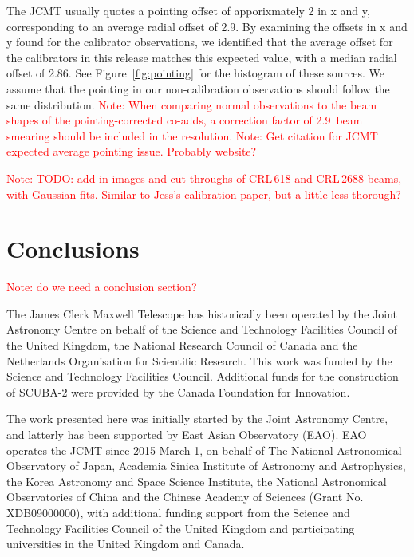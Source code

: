 \documentclass[twocolumn,times]{aastex6}
\newcommand{\note}[1]{\textcolor{red}{Note: #1}}
\begin{document}
The JCMT usually quotes a pointing offset of apporixmately 2\arcsec{}
in x and y, corresponding to an average radial offset of
2.9\arcsec{}. By examining the offsets in x and y found for the
calibrator observations, we identified that the average offset for the
calibrators in this release matches this expected value, with a median
radial offset of 2.86\arcsec{}. See Figure~\ref{fig:pointing} for the
histogram of these sources. We assume that the pointing in our
non-calibration observations should follow the same distribution. \note{When
comparing normal observations to the beam shapes of the
pointing-corrected co-adds, a correction factor of 2.9\arcsec\ beam
smearing should be included in the resolution.}
\note{Get citation for JCMT expected average pointing issue. Probably
  website?}

\note{TODO: add in images and cut throughs of CRL\,618 and CRL\,2688
  beams, with Gaussian fits. Similar to Jess's calibration paper, but
  a little less thorough?}






\section{Conclusions}
\note{do we need a conclusion section?}

\acknowledgments
The James Clerk Maxwell Telescope has historically been operated by
the Joint Astronomy Centre on behalf of the Science and Technology
Facilities Council of the United Kingdom, the National Research
Council of Canada and the Netherlands Organisation for Scientific
Research. This work was funded by the Science and Technology
Facilities Council.  Additional funds for the construction of SCUBA-2
were provided by the Canada Foundation for Innovation.

The work presented here was initially started by the Joint Astronomy
Centre, and latterly has been supported by East Asian Observatory (EAO).
EAO operates the JCMT since 2015 March 1, on behalf of The
National Astronomical Observatory of Japan, Academia Sinica Institute
of Astronomy and Astrophysics, the Korea Astronomy and Space Science
Institute, the National Astronomical Observatories of China and the
Chinese Academy of Sciences (Grant No. XDB09000000), with additional
funding support from the Science and Technology Facilities Council of
the United Kingdom and participating universities in the United
Kingdom and Canada.
\end{document}
